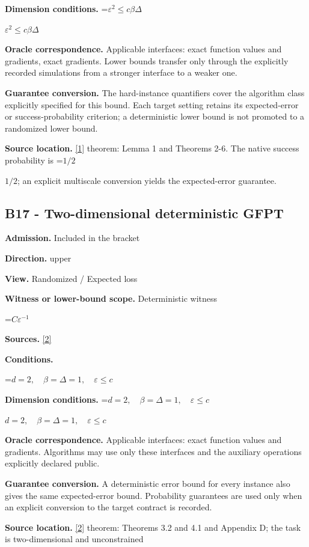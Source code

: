 \documentclass[10pt,a4paper]{article}
\newcommand{\AtlasMath}[1]{\par\begingroup\centering\setbox0=\hbox{$\displaystyle #1$}\ifdim\wd0>1.4\linewidth\typeout{ATLAS WIDE FORMULA: \the\wd0}\fi\ifdim\wd0>\linewidth\resizebox{\linewidth}{!}{\box0}\else\box0\fi\par\endgroup}
\newcommand{\AtlasInlineMath}[1]{\begingroup\setbox0=\hbox{$#1$}\ifdim\wd0>.4\linewidth\endgroup\AtlasMath{#1}\else\endgroup$#1$\fi}
\begin{document}
\textbf{Dimension conditions.} \AtlasInlineMath{\varepsilon^2\le c\beta\Delta}

\textbf{Oracle correspondence.} Applicable interfaces: exact function values and gradients, exact gradients. Lower bounds transfer only through the explicitly recorded simulations from a stronger interface to a weaker one.

\textbf{Guarantee conversion.} The hard-instance quantifiers cover the algorithm class explicitly specified for this bound. Each target setting retains its expected-error or success-probability criterion; a deterministic lower bound is not promoted to a randomized lower bound.

\textbf{Source location.} \href{https://arxiv.org/pdf/2209.07513}{[1]} theorem: Lemma 1 and Theorems 2-6. The native success probability is \AtlasInlineMath{1/2}; an explicit multiscale conversion yields the expected-error guarantee.

\subsection{B17 - Two-dimensional deterministic GFPT}
\textbf{Admission.} Included in the bracket

\textbf{Direction.} upper

\textbf{View.} Randomized / Expected loss

\textbf{Witness or lower-bound scope.} Deterministic witness

\AtlasMath{C\varepsilon^{-1}}
\textbf{Sources.} \href{https://arxiv.org/pdf/2310.09157}{[2]}

\textbf{Conditions.} 
\AtlasMath{d=2,\quad\beta=\Delta=1,\quad\varepsilon\le c}


\textbf{Dimension conditions.} \AtlasInlineMath{d=2,\quad\beta=\Delta=1,\quad\varepsilon\le c}

\textbf{Oracle correspondence.} Applicable interfaces: exact function values and gradients. Algorithms may use only these interfaces and the auxiliary operations explicitly declared public.

\textbf{Guarantee conversion.} A deterministic error bound for every instance also gives the same expected-error bound. Probability guarantees are used only when an explicit conversion to the target contract is recorded.

\textbf{Source location.} \href{https://arxiv.org/pdf/2310.09157}{[2]} theorem: Theorems 3.2 and 4.1 and Appendix D; the task is two-dimensional and unconstrained
\end{document}
